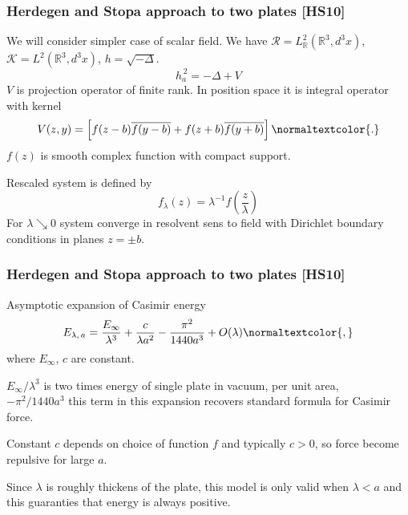 \documentclass[10pt,t]{beamer}  %
\newcommand{\Rc}{\mathcal{R}}
\begin{document}
\begin{frame}
  \frametitle{Herdegen and Stopa approach to two plates [HS10]}


  We will consider simpler case of scalar field. We have
  $\Rc = L^{ 2 }_{ \mathbb{R} }( \mathbb{R}^{ 3 }, d^{ 3 }x )$,
  $\mathcal{K} = L^{ 2 }( \mathbb{R}^{ 3 }, d^{ 3 }x )$,
  $h = \sqrt{ -\Delta }$.
  \begin{equation}
    \label{eq:17}
    h_{ a }^{ \, 2 }
    =
    -\Delta + V
  \end{equation}
  $V$ is projection operator of finite rank. In position space it is
  integral operator with kernel
  \begin{equation}
    \label{eq:18}
    V( z, y )
    =
    \left[ f( z - b ) \overline{ f( y - b ) } + f( z + b )
      \overline{ f( y + b ) } \right]\normaltextcolor{.}
  \end{equation}
  $f( z )$ is smooth complex function with compact support.

  Rescaled system is defined by
  \begin{equation}
    \label{eq:19}
    f_{ \lambda }( z ) = \lambda^{ -1 } f\left( \frac{ z }{ \lambda } \right)
  \end{equation}
  For $\lambda \searrow 0$ system converge in resolvent sens to field
  with Dirichlet boundary conditions in planes $z = \pm b$.

\end{frame}





\begin{frame}
  \frametitle{Herdegen and Stopa approach to two plates [HS10]}


  Asymptotic expansion of Casimir energy
  \begin{equation}
    \label{eq:20}
    E_{ \lambda,\, a }
    = \frac{ E_{ \infty } }{ \lambda^{ 3 } } + \frac{ c }{ \lambda a^{ 2 } }
    - \frac{ \pi^{ 2 } }{ 1440 a^{ 3 } } + O( \lambda )\normaltextcolor{,}
  \end{equation}
  where $E_{ \infty }$, $c$ are constant.

  $E_{ \infty } / \lambda^{ 3 }$ is two times energy of single plate
  in vacuum, per unit
  area, \\
  $-\pi^{ 2 } / 1440 a^{ 3 }$ this term in this expansion recovers
  standard formula for Casimir force.

  Constant $c$ depends on choice of function $f$ and typically
  $c > 0$, so force become repulsive for large $a$.

  Since $\lambda$ is roughly thickens of the plate, this model is only
  valid when $\lambda < a$ and this guaranties that energy is always
  positive.

\end{frame}
\end{document}
